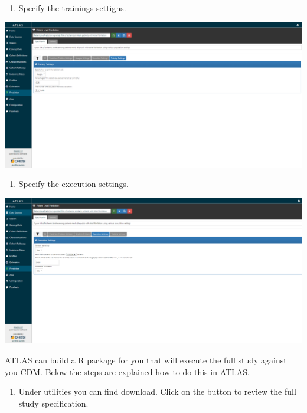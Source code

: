 \documentclass[]{book}
\providecommand{\tightlist}{%
  \setlength{\itemsep}{0pt}\setlength{\parskip}{0pt}}
\begin{document}
\newpage

\begin{enumerate}
\def\labelenumi{\arabic{enumi}.}
\setcounter{enumi}{2}
\tightlist
\item
  Specify the trainings settigns.
\end{enumerate}

\includegraphics[width=1\linewidth]{images/PatientLevelPrediction/atlasplp3}

\begin{enumerate}
\def\labelenumi{\arabic{enumi}.}
\setcounter{enumi}{3}
\tightlist
\item
  Specify the execution settings.
\end{enumerate}

\includegraphics[width=1\linewidth]{images/PatientLevelPrediction/atlasplp4}

\newpage

ATLAS can build a R package for you that will execute the full study
against you CDM. Below the steps are explained how to do this in ATLAS.

\begin{enumerate}
\def\labelenumi{\arabic{enumi}.}
\tightlist
\item
  Under utilities you can find download. Click on the button to review
  the full study specification.
\end{enumerate}
\end{document}
